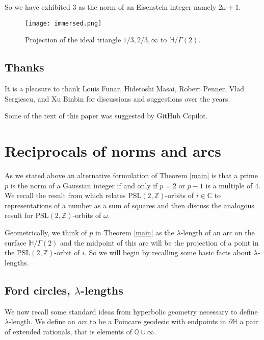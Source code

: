 \documentclass[12pt]{amsart}
\theoremstyle{plain}
\theoremstyle{definition}
\def\HH{\mathbb{H}}
\def\xx{\HH/g2}
\def\ZZ{\mathbb{Z}}
\def\CC{\mathbb{C}}
\def\QQ{\mathbb{Q}}
\def\sl2{\mathrm{PSL}(2, \ZZ)}
\def\g2{\Gamma(2)}
\def\xx{\HH/\g2}
\begin{document}
So we have exhibited $3$ as the norm of an Eisenstein integer namely
$2\omega + 1$. 


\begin{figure}[h]
\begin{center}
\texttt{[image: immersed.png]} 
\end{center}
\caption{Projection of  the ideal triangle $1/3, 2/3,\infty$
to $\xx$.}
	\label{immersed triangle}
\end{figure}

 
\subsection{Thanks}

It is a pleasure to thank Louis Funar, Hidetoshi Masai, Robert
Penner, Vlad Sergiescu, and Xu Binbin for discussions and
suggestions over the years.

Some of the text of this paper was suggested by GitHub
Copilot\cite{copilot, vim_copilot}.

\section{Reciprocals of norms and arcs}

As we stated above an alternative formulation 
of Theorem \ref{main}  is that
a prime $p$ is the norm of a Gaussian integer
if and only if $p=2$ or $p-1$ is a multiple of $4$.
We recall the result from \cite{vlad} 
which relates $\sl2$-orbits of $i \in \CC$
to representations of a number as a sum of squares
and then discuss the analogous result for 
$\sl2$-orbits of $ \omega$.

Geometrically, we think of $p$ in Theorem \ref{main}
as the $\lambda$-length of an arc on the surface $\xx$
and the midpoint of this arc will be the projection 
of a point in the $\sl2$-orbit of $i$.
So we will begin by recalling some basic facts about
$\lambda$-lengths.

\subsection{Ford circles, $\lambda$-lengths} 
\label{lengths}

We now recall some standard ideas from hyperbolic geometry
necessary to define $\lambda$-length.
We define an \textit{arc} to be a Poincare geodesic
with endpoints in $\partial \HH$ a pair of extended rationals, 
that is elements of $\QQ \cup \infty$.
\end{document}
